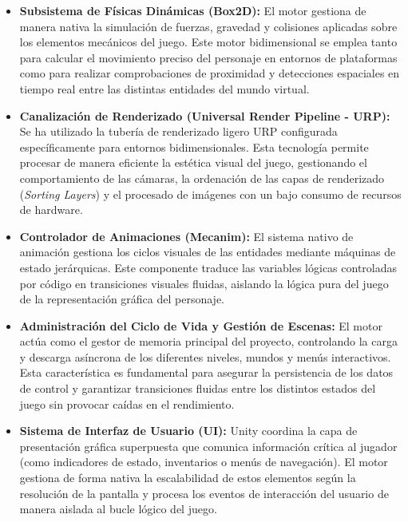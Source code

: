\begin{itemize}
    \item \textbf{Subsistema de Físicas Dinámicas (Box2D):} El motor gestiona de manera nativa la simulación de fuerzas, gravedad y colisiones aplicadas sobre los elementos mecánicos del juego. Este motor bidimensional se emplea tanto para calcular el movimiento preciso del personaje en entornos de plataformas como para realizar comprobaciones de proximidad y detecciones espaciales en tiempo real entre las distintas entidades del mundo virtual.
    
    \item \textbf{Canalización de Renderizado (Universal Render Pipeline - URP):} Se ha utilizado la tubería de renderizado ligero URP configurada específicamente para entornos bidimensionales. Esta tecnología permite procesar de manera eficiente la estética visual del juego, gestionando el comportamiento de las cámaras, la ordenación de las capas de renderizado (\textit{Sorting Layers}) y el procesado de imágenes con un bajo consumo de recursos de hardware.
    
    \item \textbf{Controlador de Animaciones (Mecanim):} El sistema nativo de animación gestiona los ciclos visuales de las entidades mediante máquinas de estado jerárquicas. Este componente traduce las variables lógicas controladas por código en transiciones visuales fluidas, aislando la lógica pura del juego de la representación gráfica del personaje.
    
    \item \textbf{Administración del Ciclo de Vida y Gestión de Escenas:} El motor actúa como el gestor de memoria principal del proyecto, controlando la carga y descarga asíncrona de los diferentes niveles, mundos y menús interactivos. Esta característica es fundamental para asegurar la persistencia de los datos de control y garantizar transiciones fluidas entre los distintos estados del juego sin provocar caídas en el rendimiento.
    
    \item \textbf{Sistema de Interfaz de Usuario (UI):} Unity coordina la capa de presentación gráfica superpuesta que comunica información crítica al jugador (como indicadores de estado, inventarios o menús de navegación). El motor gestiona de forma nativa la escalabilidad de estos elementos según la resolución de la pantalla y procesa los eventos de interacción del usuario de manera aislada al bucle lógico del juego.
\end{itemize}

